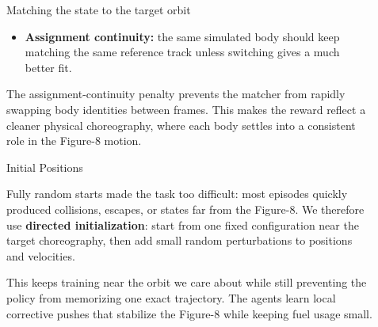 \documentclass[final]{beamer}
\newlength{\sepwidth}
\newlength{\colwidth}
\newlength{\rightwide}
\newcommand{\separatorcolumn}{\begin{column}{\sepwidth}\end{column}}
\begin{document}
\begin{frame}[t]
\begin{columns}[t]
\begin{column}{\rightwide}
\begin{columns}[t,totalwidth=\rightwide]
\begin{column}{\colwidth}
\begin{block}{Matching the state to the target orbit}
\begin{itemize}
          \item \textbf{Assignment continuity:} the same simulated body should keep
          matching the same reference track unless switching gives a much better fit.
        \end{itemize}

        The assignment-continuity penalty prevents the matcher from rapidly
        swapping body identities between frames. This makes the reward reflect a
        cleaner physical choreography, where each body settles into a consistent
        role in the Figure-8 motion.

      \end{block}

      \begin{block}{Initial Positions}

        Fully random starts made the task too difficult: most episodes quickly
        produced collisions, escapes, or states far from the Figure-8. We
        therefore use \textbf{directed initialization}: start from one fixed
        configuration near the target choreography, then add small random
        perturbations to positions and velocities.

        This keeps training near the orbit we care about while still preventing
        the policy from memorizing one exact trajectory. The agents learn local
        corrective pushes that stabilize the Figure-8 while keeping fuel usage
        small.

      \end{block}

    \end{column}

    \separatorcolumn

    \begin{column}{\colwidth}








\end{column}
\end{columns}
\end{column}
\end{columns}
\end{frame}
\end{document}
